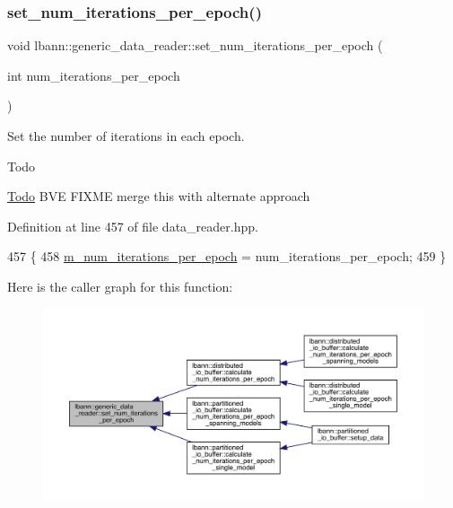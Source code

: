 \subsubsection{\texorpdfstring{set\+\_\+num\+\_\+iterations\+\_\+per\+\_\+epoch()}{set\_num\_iterations\_per\_epoch()}}
{\footnotesize\ttfamily void lbann\+::generic\+\_\+data\+\_\+reader\+::set\+\_\+num\+\_\+iterations\+\_\+per\+\_\+epoch (\begin{DoxyParamCaption}\item[{int}]{num\+\_\+iterations\+\_\+per\+\_\+epoch }\end{DoxyParamCaption})\hspace{0.3cm}{\ttfamily [inline]}}



Set the number of iterations in each epoch. 

\begin{DoxyRefDesc}{Todo}
\item[\hyperlink{todo__todo000018}{Todo}]B\+VE F\+I\+X\+ME merge this with alternate approach \end{DoxyRefDesc}


Definition at line 457 of file data\+\_\+reader.\+hpp.


\begin{DoxyCode}
457                                                                   \{
458     \hyperlink{classlbann_1_1generic__data__reader_ab570063483a1f604ca2fc536c3d83de7}{m\_num\_iterations\_per\_epoch} = num\_iterations\_per\_epoch;  
459   \}
\end{DoxyCode}
Here is the caller graph for this function\+:\nopagebreak
\begin{figure}[H]
\begin{center}
\leavevmode
\includegraphics[width=350pt]{classlbann_1_1generic__data__reader_a91573d9599b503a6bdf2939e69659e8b_icgraph}
\end{center}
\end{figure}
\mbox{\label{classlbann_1_1generic__data__reader_a9b348d52852062dbc66b0accde5c6e8a}} 
